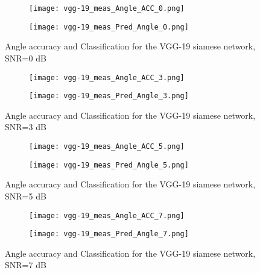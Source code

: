   \begin{figure}[htbp]
    \centering
    \begin{subfigure}{.5\textwidth}
      \centering
      \texttt{[image: vgg-19\_meas\_Angle\_ACC\_0.png]}
    \end{subfigure}%
    \begin{subfigure}{.5\textwidth}
      \centering
      \texttt{[image: vgg-19\_meas\_Pred\_Angle\_0.png]}
    \end{subfigure}
    \caption{Angle accuracy and Classification for the VGG-19 siamese network, SNR=0 dB}
    \label{fig:vgg-19_snr6}
  \end{figure}

  \begin{figure}[htbp]
    \centering
    \begin{subfigure}{.5\textwidth}
      \centering
      \texttt{[image: vgg-19\_meas\_Angle\_ACC\_3.png]}
    \end{subfigure}%
    \begin{subfigure}{.5\textwidth}
      \centering
      \texttt{[image: vgg-19\_meas\_Pred\_Angle\_3.png]}
    \end{subfigure}
    \caption{Angle accuracy and Classification for the VGG-19 siamese network, SNR=3 dB}
    \label{fig:vgg-19_snr7}
  \end{figure}

  \begin{figure}[htbp]
    \centering
    \begin{subfigure}{.5\textwidth}
      \centering
      \texttt{[image: vgg-19\_meas\_Angle\_ACC\_5.png]}
    \end{subfigure}%
    \begin{subfigure}{.5\textwidth}
      \centering
      \texttt{[image: vgg-19\_meas\_Pred\_Angle\_5.png]}
    \end{subfigure}
    \caption{Angle accuracy and Classification for the VGG-19 siamese network, SNR=5 dB}
    \label{fig:vgg-19_snr8}
  \end{figure}

  \begin{figure}[htbp]
    \centering
    \begin{subfigure}{.5\textwidth}
      \centering
      \texttt{[image: vgg-19\_meas\_Angle\_ACC\_7.png]}
    \end{subfigure}%
    \begin{subfigure}{.5\textwidth}
      \centering
      \texttt{[image: vgg-19\_meas\_Pred\_Angle\_7.png]}
    \end{subfigure}
    \caption{Angle accuracy and Classification for the VGG-19 siamese network, SNR=7 dB}
    \label{fig:vgg-19_snr9}
  \end{figure}

